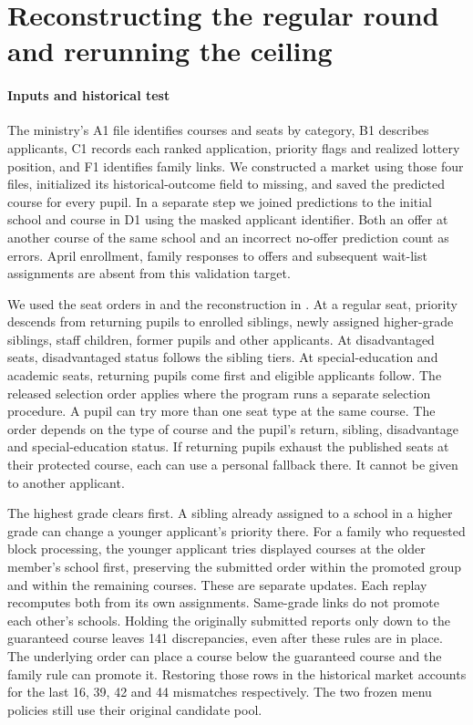 \section{Reconstructing the regular round and rerunning the ceiling}\label{sec:institution}

\paragraph{Inputs and historical test}
The ministry's A1 file identifies courses and seats by category, B1 describes applicants, C1 records each ranked application, priority flags and realized lottery position, and F1 identifies family links. We constructed a market using those four files, initialized its historical-outcome field to missing, and saved the predicted course for every pupil. In a separate step we joined predictions to the initial school and course in D1 using the masked applicant identifier. Both an offer at another course of the same school and an incorrect no-offer prediction count as errors. April enrollment, family responses to offers and subsequent wait-list assignments are absent from this validation target.

We used the seat orders in \citet[Tables 1--2]{correaschool} and the reconstruction in \citet[Appendix S7]{doganreserves}. At a regular seat, priority descends from returning pupils to enrolled siblings, newly assigned higher-grade siblings, staff children, former pupils and other applicants. At disadvantaged seats, disadvantaged status follows the sibling tiers. At special-education and academic seats, returning pupils come first and eligible applicants follow. The released selection order applies where the program runs a separate selection procedure. A pupil can try more than one seat type at the same course. The order depends on the type of course and the pupil's return, sibling, disadvantage and special-education status. If returning pupils exhaust the published seats at their protected course, each can use a personal fallback there. It cannot be given to another applicant.

The highest grade clears first. A sibling already assigned to a school in a higher grade can change a younger applicant's priority there. For a family who requested block processing, the younger applicant tries displayed courses at the older member's school first, preserving the submitted order within the promoted group and within the remaining courses. These are separate updates. Each replay recomputes both from its own assignments. Same-grade links do not promote each other's schools. Holding the originally submitted reports only down to the guaranteed course leaves 141 discrepancies, even after these rules are in place. The underlying order can place a course below the guaranteed course and the family rule can promote it. Restoring those rows in the historical market accounts for the last 16, 39, 42 and 44 mismatches respectively. The two frozen menu policies still use their original candidate pool.

